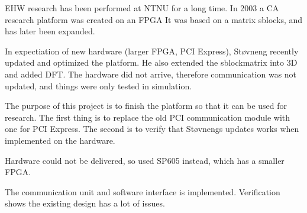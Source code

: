 
EHW research has been performed at NTNU for a long time.
In 2003 a CA research platform was created on an FPGA
It was based on a matrix sblocks, and has later been expanded.

In expectiation of new hardware (larger FPGA, PCI Express), Støvneng recently updated and optimized the platform.
He also extended the sblockmatrix into 3D and added DFT.
The hardware did not arrive, therefore communication was not updated, and things were only tested in simulation.

The purpose of this project is to finish the platform so that it can be used for research.
The first thing is to replace the old PCI communication module with one for PCI Express.
The second is to verify that Støvnengs updates works when implemented on the hardware.

Hardware could not be delivered, so used SP605 instead, which has a smaller FPGA.

The communication unit and software interface is implemented.
Verification shows the existing design has a lot of issues.

